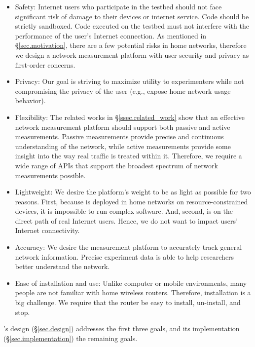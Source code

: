 \begin{itemize}
\item Safety: Internet users who participate in the testbed should not face significant risk of damage to their devices or internet service. Code should be strictly sandboxed. Code executed on the testbed must not interfere with the performance of the user's Internet connection. As mentioned in \S{\ref{sec.motivation}}, there are a few potential risks in home networks, therefore we design a network measurement platform with user security and privacy as first-order concerns.

\item Privacy: Our goal is striving to maximize utility to experimenters while not compromising the privacy of the user (e.g., expose home network usage behavior).

\item Flexibility: The related works in \S{\ref{ssec.related_work}} show that an effective network measurement platform should support both passive and active measurements. Passive measurements provide precise and continuous understanding of the network, while active measurements provide some insight into the way real traffic is treated within it. Therefore, we require a wide range of APIs that support the broadest spectrum of network measurements possible.

\item Lightweight: We desire the platform's weight to be as light as possible for two reasons. First, because \sysname is deployed in home networks on resource-constrained devices, it is impossible to run complex software. And, second,  \sysname is on the direct path of real Internet users. Hence, we do not want to impact users' Internet connectivity.

\item Accuracy: We desire the measurement platform to accurately track 
general network information. Precise experiment data is able to help researchers better understand the network.

\item Ease of installation and use: Unlike computer or mobile environments, many people are not familiar with home wireless routers. Therefore, installation is a big challenge. We require that the router be easy to install, un-install, and stop.
\end{itemize}

\sysname's design (\S\ref{sec.design}) addresses the first three goals, and its implementation (\S\ref{sec.implementation}) the remaining goals.
